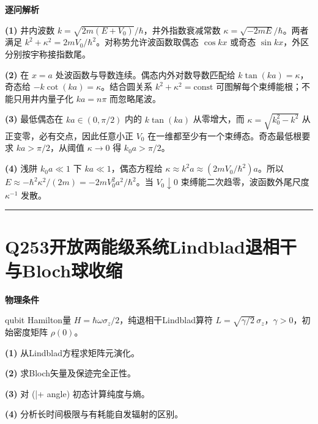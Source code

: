 \documentclass[UTF8,a4paper,11pt,oneside,openany]{ctexbook}
\begin{document}
\par\medskip\noindent\textbf{逐问解析}
\par\noindent\textbf{(1)} 井内波数 \(k=\sqrt{2m(E+V_0)}/\hbar\)，井外指数衰减常数 \(\kappa=\sqrt{-2mE}/\hbar\)。两者满足 \(k^2+\kappa^2=2mV_0/\hbar^2\)。对称势允许波函数取偶态 \(\cos kx\) 或奇态 \(\sin kx\)，外区分别按宇称接指数尾。
\par\noindent\textbf{(2)} 在 \(x=a\) 处波函数与导数连续。偶态内外对数导数匹配给 \(k\tan(ka)=\kappa\)，奇态给 \(-k\cot(ka)=\kappa\)。结合圆关系 \(k^2+\kappa^2=\mathrm{const}\) 可图解每个束缚能根；不能只用井内量子化 \(ka=n\pi\) 而忽略尾波。
\par\noindent\textbf{(3)} 最低偶态在 \(ka\in(0,\pi/2)\) 内的 \(k\tan(ka)\) 从零增大，而 \(\kappa=\sqrt{k_0^2-k^2}\) 从正变零，必有交点，因此任意小正 \(V_0\) 在一维都至少有一个束缚态。奇态最低根要求 \(ka>\pi/2\)，从阈值 \(\kappa\to0\) 得 \(k_0a>\pi/2\)。
\par\noindent\textbf{(4)} 浅阱 \(k_0a\ll1\) 下 \(ka\ll1\)，偶态方程给 \(\kappa\approx k^2a\approx(2mV_0/\hbar^2)a\)。所以 \(E\approx-\hbar^2\kappa^2/(2m)=-2mV_0^2a^2/\hbar^2\)。当 \(V_0\downarrow0\) 束缚能二次趋零，波函数外尾尺度 \(\kappa^{-1}\) 发散。

\par\bigskip\hrule\bigskip
\section*{Q253\quad 开放两能级系统Lindblad退相干与Bloch球收缩}
\textbf{物理条件}\par qubit Hamilton量 \(H=\hbar\omega\sigma_z/2\)，纯退相干Lindblad算符 \(L=\sqrt{\gamma/2}\,\sigma_z\)，\(\gamma>0\)，初始密度矩阵 \(\rho(0)\)。
\par\noindent\textbf{(1)} 从Lindblad方程求矩阵元演化。
\par\noindent\textbf{(2)} 求Bloch矢量及保迹完全正性。
\par\noindent\textbf{(3)} 对 (|+
angle) 初态计算纯度与熵。
\par\noindent\textbf{(4)} 分析长时间极限与有耗能自发辐射的区别。
\end{document}
